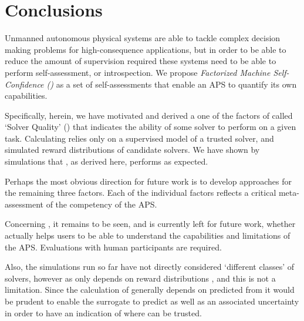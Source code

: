 \section{Conclusions}
Unmanned autonomous physical systems are able to tackle complex decision making problems for high-consequence applications, but in order to be able to reduce the amount of supervision required these systems need to be able to perform self-assessment, or introspection. We propose \emph{Factorized Machine Self-Confidence (\famsec)} as a set of self-assessments that enable an APS to quantify its own capabilities.

Specifically, herein, we have motivated and derived a one of the factors of \famsec{} called `Solver Quality' (\xQ) that indicates the ability of some solver to perform on a given task. Calculating \xQ{} relies only on a supervised model of a trusted solver, and simulated reward distributions of candidate solvers. We have shown by simulations that \xQ{}, as derived here, performs as expected.

Perhaps the most obvious direction for future work is to develop approaches for the remaining three \famsec{} factors. Each of the individual factors reflects a critical meta-assessment of the competency of the APS.

Concerning \xQ{}, it remains to be seen, and is currently left for future work, whether \xQ{} actually helps users to be able to understand the capabilities and limitations of the APS. Evaluations with human participants are required.

Also, the simulations run so far have not directly considered `different classes' of solvers, however as \xQ{} only depends on reward distributions \rwd{}, and \rwdstar{} this is not a limitation. Since the calculation of \xQ{} generally depends on \rwdstar{} predicted from \surrogate{} it would be prudent to enable the surrogate to predict \rwdstar{} as well as an associated uncertainty in order to have an indication of where \surrogate{} can be trusted.

